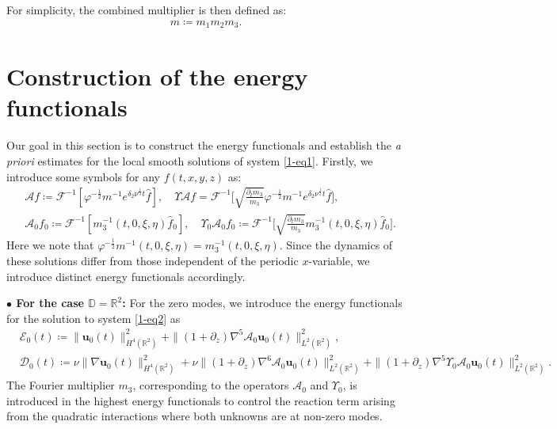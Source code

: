 \documentclass[11pt,reqno]{article}
\numberwithin{equation}{section}
\newcommand\R{{\mathbb R}}
\newcommand\DD{{\mathbb D}}
\newcommand\D{{\mathcal D}}
\newcommand\F{{\mathcal F}}
\newcommand\E{{\mathcal E}}
\newcommand\A{\mathcal{A}}
\newcommand\x{\bm{x}}
\newcommand\uu{\bm{u}}
\newcommand \tri {\coloneqq}
\let\pa=\partial
\let\f=\frac
\begin{document}
For simplicity, the combined multiplier is then defined as:
\begin{align*}
m\tri m_1m_2m_3.
\end{align*}





\section{Construction of the energy functionals}
\label{sec3:energy fun}
Our goal in this section is to %
construct the energy functionals and establish the \textit{a priori} estimates for the local smooth solutions of system \eqref{1-eq1}.
Firstly, we introduce some symbols for any $f(t,x,y,z)$ as:
\begin{align}
&\A f \tri
\F^{-1}[\varphi^{-\f12}m^{-1}e^{\delta_2\nu^{\f13}t}\hat{f}], 
\quad 
\varUpsilon\A f=  \F^{-1}\big[\sqrt{\f{\pa_tm_3}{m_3}}\varphi^{-\f12}m^{-1}e^{\delta_2\nu^{\f13}t}\hat{f}\big],
\label{def-Af}
\\
&\A_0 f_0\tri \F^{-1}[m_3^{-1}(t,0,\xi,\eta)\hat{f}_0],
\quad
\varUpsilon_0\A_0 f_0\tri \F^{-1}\big[\sqrt{\f{\pa_tm_3}{m_3}}m_3^{-1}(t,0,\xi,\eta)\hat{f}_0\big].
\label{def-A0f0}
\end{align}
Here we note that $\varphi^{-\f12}m^{-1}(t,0,\xi,\eta)=m_3^{-1}(t,0,\xi,\eta)$.
Since the dynamics of these solutions differ from those independent of the periodic $x$-variable, we introduce distinct energy functionals accordingly.


\medskip

\noindent\textbf{$\bullet$ For the case $\DD=\R^2$:} 
For the zero modes, we introduce the energy functionals for the solution to system \eqref{1-eq2} as
\begin{align}
\label{def: e-1}
&\E_0(t) \tri  \|\uu_0(t)\|_{H^4(\R^2)}^2+\|(1+\pa_z)\nabla^5\A_0\uu_0(t)\|_{L^2(\R^2)}^2,
\\
\label{def: d-1}
&\D_0(t)\tri  \nu \|\nabla \uu_0(t)\|_{H^4(\R^2)}^2
+\nu\|(1+\pa_z)\nabla^6 \A_0\uu_0(t)\|_{L^2(\R^2)}^2
+\|(1+\pa_z)\nabla^5 \varUpsilon_0\A_0\uu_0(t)\|_{L^2(\R^2)}^2.
\end{align}
The Fourier multiplier $m_3$, corresponding to the operators $\A_0$ and $\varUpsilon_0$, is introduced in the highest energy functionals to control the reaction term arising from the quadratic interactions where both unknowns are at non-zero modes.
\end{document}
